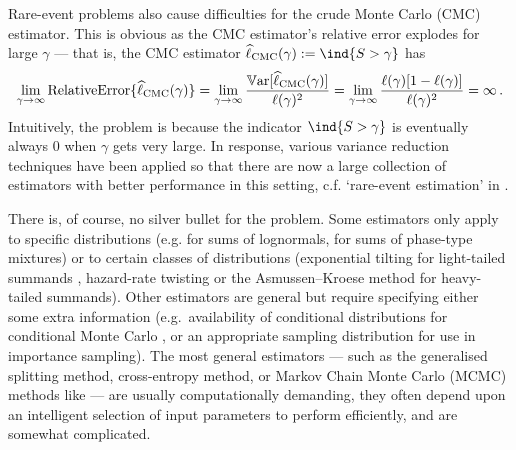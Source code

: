 Rare-event problems also cause difficulties for the crude Monte Carlo (CMC) estimator. This is obvious as the CMC estimator's relative error explodes for large $\gamma$ --- that is, the CMC estimator $\hat{\ell}_{\mathrm{CMC}}(\gamma) := \ind{S > \gamma}$ has
\[ \lim_{\gamma \to \infty} \mathrm{RelativeError}\{ \widehat{\ell}_{\mathrm{CMC}}(\gamma) \} = \lim_{\gamma \to \infty} \frac{ \operatorname{\mathbb{V}\mathrm{ar}}[ \widehat{\ell}_{\mathrm{CMC}}(\gamma) ] }{ \ell(\gamma)^2 } = \lim_{\gamma \to \infty} \frac{  \ell(\gamma)[1-\ell(\gamma)] }{  \ell(\gamma)^2 } = \infty \,. \]
Intuitively, the problem is because the indicator $\ind{S > \gamma}$ is eventually always 0 when $\gamma$ gets very large. In response, various variance reduction techniques have been applied so that there are now a large collection of estimators with better performance in this setting, c.f. `rare-event estimation' in \cite{kroese2013handbook,asmussen2007stochastic,glasserman2003monte}.

There is, of course, no silver bullet for the problem. Some estimators only apply to specific distributions (e.g. \cite{botev2017fast} for sums of lognormals, \cite{yao2016estimating} for sums of phase-type mixtures) or to certain classes of distributions (exponential tilting for light-tailed summands \cite{kroese2013handbook,asmussen2007stochastic}, hazard-rate twisting or the Asmussen--Kroese method \cite{asmussen2006improved} for heavy-tailed summands). Other estimators are general but require specifying either some extra information (e.g.\ availability of conditional distributions for conditional Monte Carlo \cite{asmussen2017conditional}, or an appropriate sampling distribution for use in importance sampling). The most general estimators --- such as the generalised splitting method, cross-entropy method, or Markov Chain Monte Carlo (MCMC) methods like \cite{chan2012improved} --- are usually computationally demanding, they often depend upon an intelligent selection of input parameters to perform efficiently, and are somewhat complicated.

